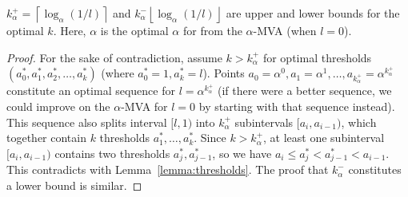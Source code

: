 \begin{theorem}\label{theorem:k_bounds}
$k_\alpha^+ = \left\lceil \log_{\alpha} \left(1/l\right) \right\rceil$ and 
$k_\alpha^- \left\lfloor \log_{\alpha} \left(1/l\right) \right\rfloor$ are upper
and lower bounds for the optimal $k$. Here, $\alpha$ is the optimal $\alpha$ for
from the
$\alpha$-MVA (when $l = 0$). 
\end{theorem}
\begin{proof}
For the sake of contradiction, assume $k > k_\alpha^+$ for optimal thresholds
$(a^*_0, a^*_1, a^*_2, \ldots, a^*_k)$ (where $a^*_0 = 1, a^*_k = l$).  
Points $a_0 = \alpha^0, a_1 = \alpha^1, \ldots, a_{k_\alpha^+} = \alpha^{k_\alpha^+}$
constitute an optimal sequence for $l=\alpha^{k_\alpha^+}$ (if there were a
better sequence, we could improve on the $\alpha$-MVA for $l=0$ by starting
with that sequence instead).
This sequence also
splits interval $[l, 1)$ into $k_\alpha^+$ subintervals $[a_i, a_{i-1})$, which
together contain $k$ thresholds $a^*_1, \ldots, a^*_k$. Since $k > k_\alpha^+$, at
least one subinterval $[a_i, a_{i-1})$ contains two thresholds $a^*_j,
a^*_{j-1}$, so we have $a_i \leq a^*_j < a^*_{j-1} < a_{i-1}$.  This
contradicts with Lemma~\ref{lemma:thresholds}.
The proof that $k_\alpha^-$ constitutes a lower bound is similar.
\end{proof}







